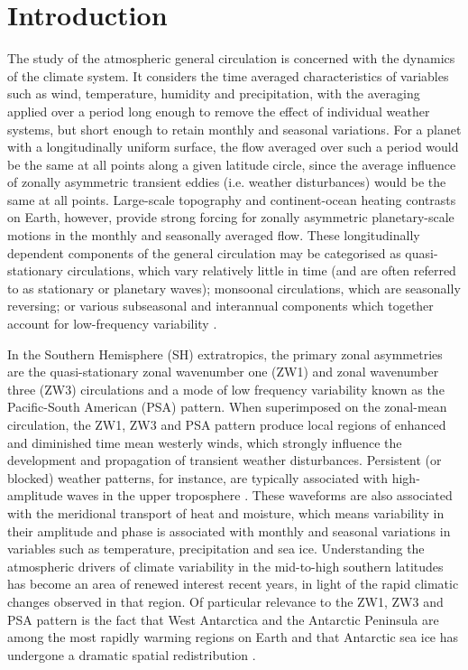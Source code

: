 
\chapter{Introduction}


The study of the atmospheric general circulation is concerned with the dynamics of the climate system. It considers the time averaged characteristics of variables such as wind, temperature, humidity and precipitation, with the averaging applied over a period long enough to remove the effect of individual weather systems, but short enough to retain monthly and seasonal variations. For a planet with a longitudinally uniform surface, the flow averaged over such a period would be the same at all points along a given latitude circle, since the average influence of zonally asymmetric transient eddies (i.e. weather disturbances) would be the same at all points. Large-scale topography and continent-ocean heating contrasts on Earth, however, provide strong forcing for zonally asymmetric planetary-scale motions in the monthly and seasonally averaged flow. These longitudinally dependent components of the general circulation may be categorised as quasi-stationary circulations, which vary relatively little in time (and are often referred to as stationary or planetary waves); monsoonal circulations, which are seasonally reversing; or various subseasonal and interannual components which together account for low-frequency variability \citep{Holton2013}. 

In the Southern Hemisphere (SH) extratropics, the primary zonal asymmetries are the quasi-stationary zonal wavenumber one (ZW1) and zonal wavenumber three (ZW3) circulations and a mode of low frequency variability known as the Pacific-South American (PSA) pattern. When superimposed on the zonal-mean circulation, the ZW1, ZW3 and PSA pattern produce local regions of enhanced and diminished time mean westerly winds, which strongly influence the development and propagation of transient weather disturbances. Persistent (or blocked) weather patterns, for instance, are typically associated with high-amplitude waves in the upper troposphere \citep[e.g.][]{Trenberth1985,Renwick2005}. These waveforms are also associated with the meridional transport of heat and moisture, which means variability in their amplitude and phase is associated with monthly and seasonal variations in variables such as temperature, precipitation and sea ice. Understanding the atmospheric drivers of climate variability in the mid-to-high southern latitudes has become an area of renewed interest recent years, in light of the rapid climatic changes observed in that region. Of particular relevance to the ZW1, ZW3 and PSA pattern is the fact that West Antarctica and the Antarctic Peninsula are among the most rapidly warming regions on Earth \citep[e.g.][]{Nicolas2014} and that Antarctic sea ice has undergone a dramatic spatial redistribution \citep[e.g.][]{Simmonds2015}. 

